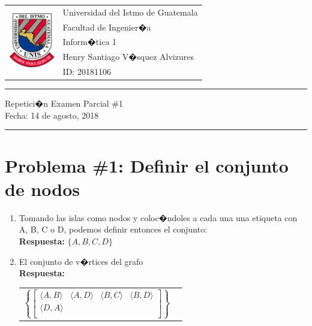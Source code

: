 \documentclass[12pt,letterpaper]{article}
\author{Santiago V�squez}
\newcommand{\horrule}[1]{\rule{\linewidth}{#1}}
\newcommand{\perlscript}[2]{
\begin{itemize}
\item[]
\end{itemize}
}
\begin{document}
\begin{tabular}{l l}
\multirow{5}{*}{\includegraphics[width=2cm]{../recursos/logo.png}}
 & Universidad del Istmo de Guatemala \\
 & Facultad de Ingenier�a \\
 & Inform�tica 1 \\
 & Henry Santiago V�squez Alvizures \\
 & ID: 20181106 \\
\end{tabular}

\begin{center}
	\horrule{0.5pt}
	\huge{Repetici�n Examen Parcial \#1} \\
	\large{Fecha: 14 de agosto, 2018 } \\
    \horrule{1pt}
\end{center}


\section*{Problema \#1: Definir el conjunto de nodos }
\begin{enumerate}
	\item{Tomando las islas como nodos y coloc�ndoles a cada una una etiqueta con A, B, C o D, podemos definir entonces el conjunto:} \\
	{\bf Respuesta:} $\{A, B , C, D\}$
	
 	\item{El conjunto de v�rtices del grafo} \\
	{\bf Respuesta:} \\
	\begin{tabular}{p{6cm} c}
    $$
     \left\{
        \begin{bmatrix}
            \langle A,B \rangle & \langle A,D \rangle & \langle B,C \rangle & \langle B,D \rangle \\
            \langle D,A \rangle  \\
        \end{bmatrix}
    \right\} 
	$$\\
	\end{tabular}
\end{enumerate}
\end{document}
